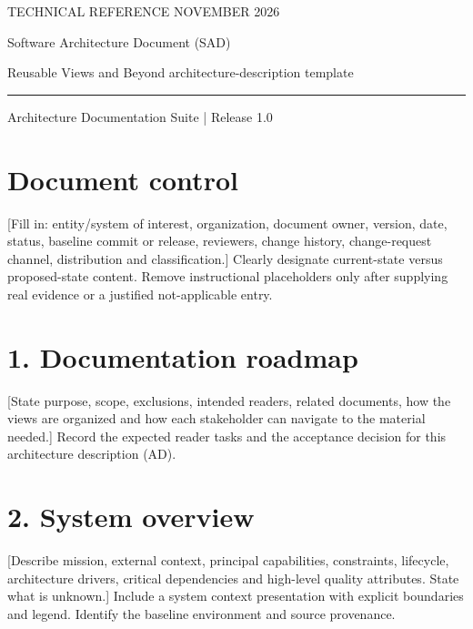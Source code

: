\documentclass[11pt,letterpaper]{article}
\begin{document}
\thispagestyle{empty}
{\color{accent}\large TECHNICAL REFERENCE \hfill NOVEMBER 2026}\par\vspace{1.1cm}
{\color{ink}\LARGE\bfseries\raggedright Software Architecture Document (SAD)}\par\vspace{0.35cm}
{\Large Reusable Views and Beyond architecture-description template}\par\vspace{0.55cm}
\rule{\textwidth}{0.7pt}\par\smallskip
{\small Architecture Documentation Suite | Release 1.0}\par\vspace{0.7cm}
\tableofcontents
\newpage
\section*{Document control}
[Fill in: entity/system of interest, organization, document owner, version, date, status, baseline commit or release, reviewers, change history, change-request channel, distribution and classification.] Clearly designate current-state versus proposed-state content. Remove instructional placeholders only after supplying real evidence or a justified not-applicable entry.\par\smallskip
\section*{1. Documentation roadmap}
[State purpose, scope, exclusions, intended readers, related documents, how the views are organized and how each stakeholder can navigate to the material needed.] Record the expected reader tasks and the acceptance decision for this architecture description (AD).\par\smallskip
\section*{2. System overview}
[Describe mission, external context, principal capabilities, constraints, lifecycle, architecture drivers, critical dependencies and high-level quality attributes. State what is unknown.] Include a system context presentation with explicit boundaries and legend. Identify the baseline environment and source provenance.\par\smallskip
\end{document}
